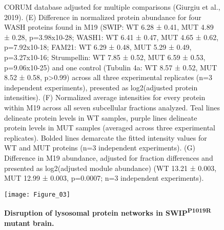 \begin{figure}[!ht]
\begin{fullwidth}
\begin{center}
{		CORUM database adjusted for multiple comparisons (Giurgiu et al., 2019). 
		(E) Difference in normalized protein abundance for four WASH proteins found in
		M19 (SWIP: WT 6.28 ± 0.41, MUT 4.89 ± 0.28, p=3.98x10-28; WASH1: WT 6.41 ± 0.47,
		MUT 4.65 ± 0.62, p=7.92x10-18; FAM21: WT 6.29 ± 0.48, MUT 5.29 ± 0.49,
		p=3.27x10-16; Strumpellin: WT 7.85 ± 0.52, MUT 6.59 ± 0.53, p=9.06x10-25) and
		one control (Tubulin 4a: WT 8.57 ± 0.52, MUT 8.52 ± 0.58, p>0.99) across all
		three experimental replicates (n=3 independent experiments), presented as
		log2(adjusted protein intensities). 
		(F) Normalized average intensities for every protein within M19 across all seven
		subcellular fractions analyzed. Teal lines delineate protein levels in WT
		samples, purple lines delineate protein levels in MUT samples (averaged across
		three experimental replicates). Bolded lines demarcate the fitted intensity
		values for WT and MUT proteins (n=3 independent experiments). 
		(G) Difference in M19 abundance, adjusted for fraction differences and presented
		as log2(adjusted module abundance) (WT 13.21 ± 0.003, MUT 12.99 ± 0.003,
		p=0.0007; n=3 independent experiments). 
	}
	\label{fig:fig2}
	\end{center}
	\end{fullwidth}
\end{figure}


\begin{figure}[!ht]
	\begin{fullwidth}
	\begin{center}
	\captionsetup{labelformat=empty}
	\texttt{[image: Figure\_03]}
	\caption{\textbf{Disruption of lysosomal protein networks in
		SWIP\textsuperscript{P1019R} mutant brain.}}
	\end{center}
	\end{fullwidth}
\end{figure}

